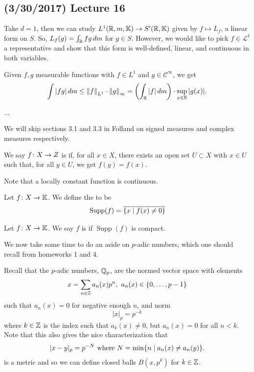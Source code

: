 \documentclass[11pt,leqno,oneside]{amsbook}
\numberwithin{thm}{section}
\newcommand{\cL}{\mathcal{L}}
\newcommand{\K}{\mathbb{K}} %
\newcommand{\supp}{\operatorname{Supp}}
\begin{document}
\subsection*{(3/30/2017) Lecture 16}
Take \(d=1\), then we can study \(L^1(\R,m,\K) \to S'(\R,\K)\) given
by \(f \mapsto L_f\), a linear form on \(S\). So, \(L_f(g) = \int_\R
fg \d m\) for \(g \in S\). However, we would like to pick \(f \in
\cL^1\) a representative and show that this form is well-defined, linear,
and continuous in both variables.
\begin{prop}
  Given \(f,g\) measurable functions with \(f \in L^1\) and \(g \in
  \mathcal{C}^\infty\), we get \[
    \int |fg| \d m \leq \norm[f]_{L^1} \cdot \norm[g]_\infty =
    \left(\int_\R |f| \d m\right) \cdot \sup_{x \in \R} |g(x)|.
  \]
\end{prop}
...
\begin{rmk}
  We will skip sections 3.1 and 3.3 in Folland on signed measures and
  complex measures respectively.
\end{rmk}
\begin{defn}
  We say \(f \from X \to Z\) is  if, for all \(x \in
  X\), there exists an open set \(U \subset X\) with \(x \in U\) such
  that, for all \(y \in U\), we get \(f(y) = f(x)\).
\end{defn}
Note that a locally constant function is continuous.
\begin{defn}
  Let \(f \from X \to \K\). We define the  to
  be \[
    \supp(f) = \ov{\{x \st f(x) \neq 0\}}
  \]
\end{defn}
\begin{defn}
  Let \(f \from X \to \K\). We say \(f\) is 
  if \(\supp(f)\) is compact.
\end{defn}
We now take some time to do an aside on \(p\)-adic numbers, which one
should recall from homeworks 1 and 4.
\begin{defn}
  Recall that the \(p\)-adic numbers, \(\Q_p\), are the normed vector
  space with elements \[
    x = \sum_{n \in \Z} a_n(x) p^n, \ a_n(x) \in \{0, \ldots, p-1\}
  \]
  such that \(a_n(x) = 0\) for negative enough \(n\), and norm \[
    |x|_p = p^{-k}
  \]
  where \(k \in \Z\) is the index such that \(a_k(x) \neq 0\), but
  \(a_n(x) = 0\) for all \(n < k\). Note that this also gives the nice
  characterization that \[
    |x-y|_p = p^{-N} \text{ where } N = \min\{n \st a_n(x) \neq a_n(y)\}.
  \]
  is a metric and so we can define closed balls \(B(x,p^k)\) for \(k
  \in \Z\).
\end{defn}
\end{document}
